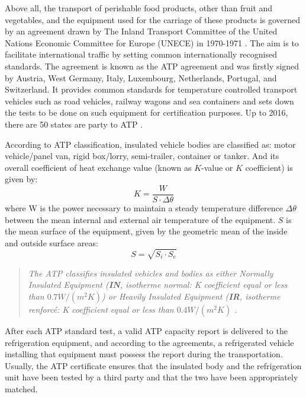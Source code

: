 Above all, the transport of perishable food products, other than fruit and vegetables, and the equipment used for the carriage of these products is governed by an agreement drawn by The Inland Transport Committee of the United Nations Economic Committee for Europe (UNECE) in 1970-1971 \citep{Geneva1970}. The aim is to facilitate international traffic by setting common internationally recognised standards. The agreement is known as the ATP agreement and was firstly signed by Austria, West Germany, Italy, Luxembourg, Netherlands, Portugal, and Switzerland.  It provides common standards for temperature controlled transport vehicles such as road vehicles, railway wagons and sea containers and sets down the tests to be done on such equipment for certification purposes. Up to 2016, there are 50 states are party to ATP \citep{ATP_wiki}.


According to ATP classification, insulated vehicle bodies are classified as: motor vehicle/panel van, rigid box/lorry, semi-trailer, container or tanker. And its overall coefficient of heat exchange value (known as $K$-value or $K$ coefficient) is given by:
\begin{equation}
K = \frac{W}{S\cdot \Delta \theta}
\end{equation}
where W is  the  power  necessary  to  maintain  a  steady  temperature  difference $\Delta \theta$ between  the  mean internal and external air temperature of the equipment. $S$ is the mean surface of the equipment, given by the geometric mean of the inside and outside surface areas:
\begin{equation}
S = \sqrt{S_i \cdot S_e}
\end{equation}

\begin{quote}
	\textit{The ATP classifies insulated vehicles and bodies as either Normally Insulated Equipment (\textbf{IN}, isotherme normal: K coefficient equal or less than $ 0.7 W/(m^2 K) $) or Heavily Insulated Equipment (\textbf{IR}, isotherme renforcé: K coefficient equal or less than $ 0.4 W/(m^2 K )$ \citep{Tassou2009}.}
\end{quote}

After each ATP standard test, a valid ATP capacity report is delivered to the refrigeration equipment, and according to the agreements, a refrigerated vehicle installing that equipment must possess the report during the transportation. Usually, the ATP certificate ensures that the insulated body and the refrigeration unit have been tested by a third party and that the two have been appropriately matched.


